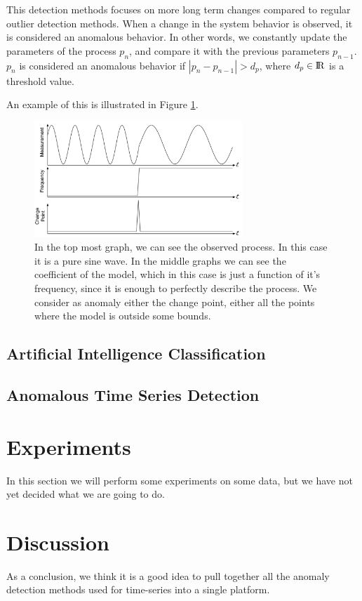 \documentclass[a4paper, 10pt]{article}
\begin{document}
This detection methods focuses on more long term changes compared to regular outlier detection methods. When a change in the system behavior is observed, it is considered an anomalous behavior. In other words, we constantly update the parameters of the process $p_n$, and compare it with the previous parameters $p_{n-1}$. $p_n$ is considered an anomalous behavior if $|p_n - p_{n-1}| > d_p$, where $d_p \in {\rm I\!R}$ is a threshold value.

An example of this is illustrated in Figure \ref{fig:changepoint}.

\begin{figure}
\centering
\includegraphics[width=0.7\textwidth]{ChangePoint}   
\caption{In the top most graph, we can see the observed process. In this case it is a pure sine wave. In the middle graphs we can see the coefficient of the model, which in this case is just a function of it's frequency, since it is enough to perfectly describe the process. We consider as anomaly either the change point, either all the points where the model is outside some bounds.}
\label{fig:changepoint}
\end{figure}

\subsection{Artificial Intelligence Classification}



\subsection{Anomalous Time Series Detection}



\section{Experiments \label{experiments}}

In this section we will perform some experiments on some data, but we have not yet decided what we are going to do.

\section{Discussion \label{discussion}}

As a conclusion, we think it is a good idea to pull together all the anomaly detection methods used for time-series into a single platform.

 

\end{document}
